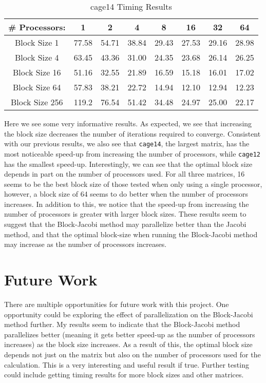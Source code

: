 \documentclass[pageno]{jpaper}
\begin{document}
\begin{doublespacing}
\begin{table}[h!]
\centering
\begin{tabular}{|c|c|c|c|c|c|c|c|}
\hline
\# Processors: & 1 & 2 & 4 & 8 & 16 & 32 & 64 \\ \hline
Block Size 1 & 77.58 & 54.71 & 38.84 & 29.43 & 27.53 & 29.16 & 28.98 \\ \hline
Block Size 4 & 63.45 & 43.36 & 31.00 & 24.35 & 23.68 & 26.14 & 26.25 \\ \hline
Block Size 16 & 51.16 & 32.55 & 21.89 & 16.59 & 15.18 & 16.01 & 17.02 \\ \hline
Block Size 64 & 57.83 & 38.21 & 22.72 & 14.94 & 12.10 & 12.94 & 12.23 \\ \hline
Block Size 256 & 119.2 & 76.54 & 51.42 & 34.48 & 24.97 & 25.00 & 22.17 \\ \hline
\end{tabular}
\label{table:7}
\caption{cage14 Timing Results}
\end{table}

Here we see some very informative results. As expected, we see that increasing the block size decreases the number of iterations required to converge. Consistent with our previous results, we also see that \verb|cage14|, the largest matrix, has the most noticeable speed-up from increasing the number of processors, while \verb|cage12| has the smallest speed-up. Interestingly, we can see that the optimal block size depends in part on the number of processors used. For all three matrices, 16 seems to be the best block size of those tested when only using a single processor, however, a block size of 64 seems to do better when the number of processors increases. In addition to this, we notice that the speed-up from increasing the number of processors is greater with larger block sizes. These results seem to suggest that the Block-Jacobi method may parallelize better than the Jacobi method, and that the optimal block-size when running the Block-Jacobi method may increase as the number of processors increases.

\section{Future Work}
\label{sec:future-work}
There are multiple opportunities for future work with this project. One opportunity could be exploring the effect of parallelization on the Block-Jacobi method further. My results seem to indicate that the Block-Jacobi method parallelizes better (meaning it gets better speed-up as the number of processors increases) as the block size increases. As a result of this, the optimal block size depends not just on the matrix but also on the number of processors used for the calculation. This is a very interesting and useful result if true. Further testing could include getting timing results for more block sizes and other matrices.


\end{doublespacing}
\end{document}
